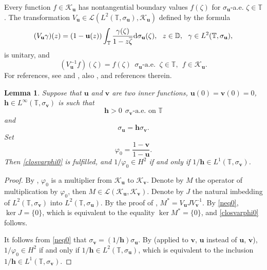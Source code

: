 \documentclass[a4paper,oneside,11pt]{amsart}
\numberwithin{equation}{section}
\theoremstyle{plain}
\newtheorem{lemma}[theorem]{Lemma}
\theoremstyle{definition}
\begin{document}
Every function $f\in\mathcal K_{\mathbf u}$ has nontangential boundary values $f(\zeta)$ for $\sigma_{\mathbf u}$-a.e. 
 $\zeta\in\mathbb T$. The transformation 
$V_{\mathbf u}\in\mathcal L(L^2(\mathbb T,\sigma_{\mathbf u}),\mathcal K_{\mathbf u} )$ defined by the formula  
$$(V_{\mathbf u}\gamma)(z)=(1-{\mathbf u}(z))\int_{\mathbb T}\frac{\gamma(\zeta)}{1-z\overline\zeta}\text{\rm d}\sigma_{\mathbf u}(\zeta),  
\ \ z\in\mathbb D,\ \ \gamma\in L^2(\mathbb T,\sigma_{\mathbf u}), $$
is unitary, and 
$$ (V_{\mathbf u}^{-1}f)(\zeta)=f(\zeta) \ \ \sigma_{\mathbf u}\text{-a.e. }\ \zeta\in\mathbb T, 
 \ \   f\in\mathcal K_{\mathbf u}.$$
For references, see \cite{clark} and \cite{polt},  also {\cite[Ch. 9 and Theorem 10.3.1]{cauchy}}, {\cite[Sec. 8]{model}} and references therein.  

\begin{lemma}\label{lemfhr}{\cite[Sec. 7]{fhr}} Suppose that ${\mathbf u}$ and ${\mathbf v}$ are two inner functions, 
 ${\mathbf u}(0)={\mathbf v}(0)=0$,  $\mathbf h\in L^\infty(\mathbb T,\sigma_{\mathbf v})$ is such that \begin{equation}\label{neq0}{\mathbf h}> 0 \ \ \sigma_{\mathbf v}\text{-a.e. on }\mathbb T
\end{equation}
 and \begin{equation}\label{uvh}\sigma_{\mathbf u}={\mathbf h}\sigma_{\mathbf v}. \end{equation}
Set \begin{equation}\label{uvphi}\varphi_0=\frac{1-{\mathbf v}}{1-{\mathbf u}}.\end{equation} 
Then \eqref{closvarphi0} is fulfilled, and $1/\varphi_0\in H^2$ if and only if $1/{\mathbf h}\in L^1(\mathbb T,\sigma_{\mathbf v})$.
\end{lemma}

\begin{proof} 
By {\cite[Corollary 7.6]{fhr}}, $\varphi_0$ is a multiplier from $\mathcal K_{\mathbf u}$ to $\mathcal K_{\mathbf v}$. 
Denote by $M$ the operator of multiplication by $\varphi_0$, then $M\in\mathcal L(\mathcal K_{\mathbf u},\mathcal K_{\mathbf v})$. Denote by $J$ the natural imbedding of $L^2(\mathbb T,\sigma_{\mathbf v})$ into $ L^2(\mathbb T,\sigma_{\mathbf u})$. 
By the proof of  {\cite[Theorem 7.3]{fhr}}, $M^*=V_{\mathbf u}J V_{\mathbf v}^{-1} $. 
By \eqref{neq0}, $\ker J=\{0\}$, which is equivalent to the equality $\ker M^*=\{0\}$, 
and   \eqref{closvarphi0} follows. 

It follows from \eqref{neq0} that  $\sigma_{\mathbf v}=(1/{\mathbf h})\sigma_{\mathbf u}$. By {\cite[Remark 7.7]{fhr}} 
(applied to ${\mathbf v}$, ${\mathbf u}$ instead of ${\mathbf u}$, ${\mathbf v}$), $1/\varphi_0\in H^2$ if and only if 
$1/{\mathbf h}\in L^2(\mathbb T,\sigma_{\mathbf u})$, which is equivalent to the inclusion 
 $1/{\mathbf h}\in L^1(\mathbb T,\sigma_{\mathbf v})$. 
\end{proof}
\end{document}
